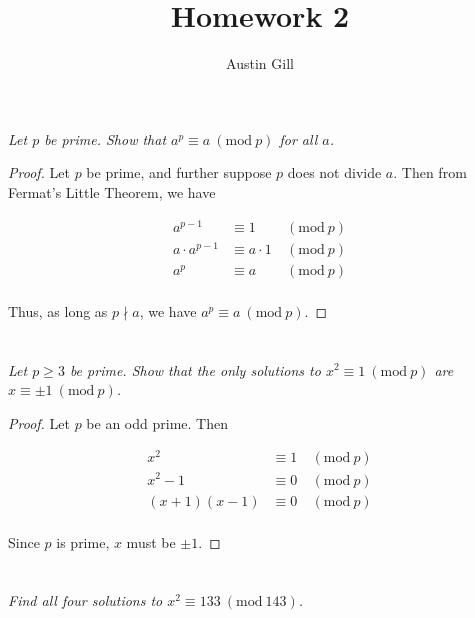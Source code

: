 \documentclass[12pt]{article}
\title{Homework 2}
\author{Austin Gill}
\renewcommand{\mod}[1]{\mathrm{mod}\ #1}
\renewcommand{\pmod}[1]{\ (\mod{#1})}
\begin{document}
\maketitle

\section{} \textit{Let $p$ be prime. Show that $a^p \equiv a \pmod{p}$ for all $a$.}

    \begin{proof}
        Let $p$ be prime, and further suppose $p$ does not divide $a$. Then from Fermat's Little Theorem, we have

        \begin{align*}
            a^{p - 1} &\equiv 1 &\pmod{p}\\
            a \cdot a^{p - 1} &\equiv a \cdot 1 &\pmod{p}\\
            a^p &\equiv a &\pmod{p}\\
        \end{align*}

        Thus, as long as $p \nmid a$, we have $a^p \equiv a \pmod{p}$.
    \end{proof}

\section{} \textit{Let $p \geq 3$ be prime. Show that the only solutions to $x^2 \equiv 1 \pmod{p}$ are $x \equiv \pm 1 \pmod{p}$.}

    \begin{proof}
        Let $p$ be an odd prime. Then

        \begin{align*}
            x^2 &\equiv 1 &\pmod{p}\\
            x^2 - 1 &\equiv 0 &\pmod{p}\\
            (x + 1)(x - 1) &\equiv 0 &\pmod{p}\\
        \end{align*}

        Since $p$ is prime, $x$ must be $\pm 1$.
    \end{proof}

\section{}
    \subsection{} \textit{Find all four solutions to $x^2 \equiv 133 \pmod{143}$.}
\end{document}
